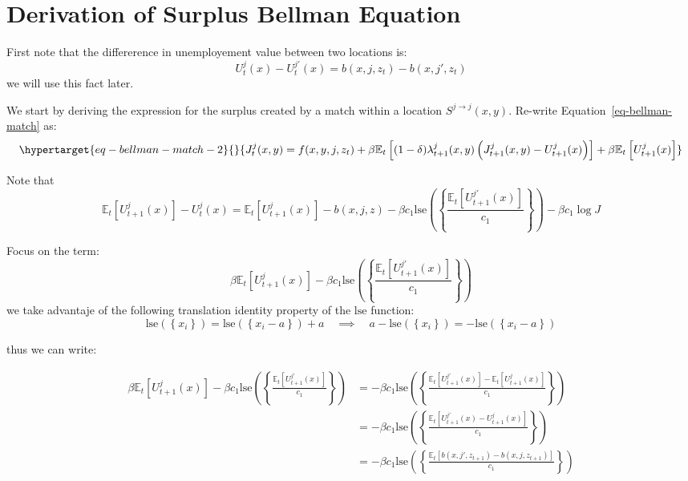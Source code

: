 \documentclass[
  letterpaper,
  DIV=11,
  numbers=noendperiod]{scrreprt}
\begin{document}
\hypertarget{sec-appendix_surplus}{%
\chapter{Derivation of Surplus Bellman
Equation}\label{sec-appendix_surplus}}

First note that the differerence in unemployement value between two
locations is:
\[U^{j}_{t}(x) - U^{j'}_{t}(x) = b(x,j,z_t) - b(x,j',z_t) \] we will use
this fact later.

We start by deriving the expression for the surplus created by a match
within a location \(S^{j\to j}(x,y)\). Re-write
Equation~\ref{eq-bellman-match} as:
\begin{equation}\protect\hypertarget{eq-bellman-match-2}{}{J^j_t(x,y) = f(x,y,j,z_t) + \beta \mathbb{E}_t\left[(1-\delta)\lambda^j_{t+1}(x,y)\left(J^j_{t+1}(x,y)-U_{t+1}^j(x)\right) \right]+ \beta \mathbb{E}_t\left[U^j_{t+1}(x)\right]}\label{eq-bellman-match-2}\end{equation}

Note that
\[\mathbb{E}_t\left[U^j_{t+1}(x)\right] - U^j_{t}(x) = \mathbb{E}_t\left[U^j_{t+1}(x)\right] - b(x,j,z)-\beta c_{1}\text{lse}\left(\left\{\frac{\mathbb{E}_{t}[U^{j'}_{t+1}(x)]}{c_{1}}\right\}\right) - \beta c_{1}\log{J}\]

Focus on the term:
\[\beta \mathbb{E}_t\left[U^j_{t+1}(x)\right] - \beta c_{1}\text{lse}\left(\left\{\frac{\mathbb{E}_{t}[U^{j'}_{t+1}(x)]}{c_{1}}\right\}\right)\]
we take advantaje of the following translation identity property of the
\(\text{lse}\) function:
\[\text{lse}\left(\left\{x_{i}\right\}\right)=\text{lse}\left(\left\{x_{i}-a\right\}\right)+a \quad \implies \quad a - \text{lse}\left(\left\{x_{i}\right\}\right) = - \text{lse}\left(\left\{x_{i}-a\right\}\right)\]

thus we can write:

\begin{align*}
  \beta \mathbb{E}_t\left[U^j_{t+1}(x)\right] - \beta c_{1}\text{lse}\left(\left\{\frac{\mathbb{E}_{t}[U^{j'}_{t+1}(x)]}{c_{1}}\right\}\right) &= - \beta c_{1}\text{lse}\left(\left\{\frac{\mathbb{E}_{t}[U^{j'}_{t+1}(x)]-\mathbb{E}_t\left[U^j_{t+1}(x)\right]}{c_{1}}\right\}\right)\\
  & = - \beta c_{1}\text{lse}\left(\left\{\frac{\mathbb{E}_{t}\left[U^{j'}_{t+1}(x)-U^j_{t+1}(x)\right]}{c_{1}} \right\}\right) \\
  & = - \beta c_{1}\text{lse}\left(\left\{\frac{\mathbb{E}_{t}\left[b(x,j',z_{t+1}) - b(x,j,z_{t+1})\right]}{c_{1}} \right\}\right) 
\end{align*}
\end{document}
